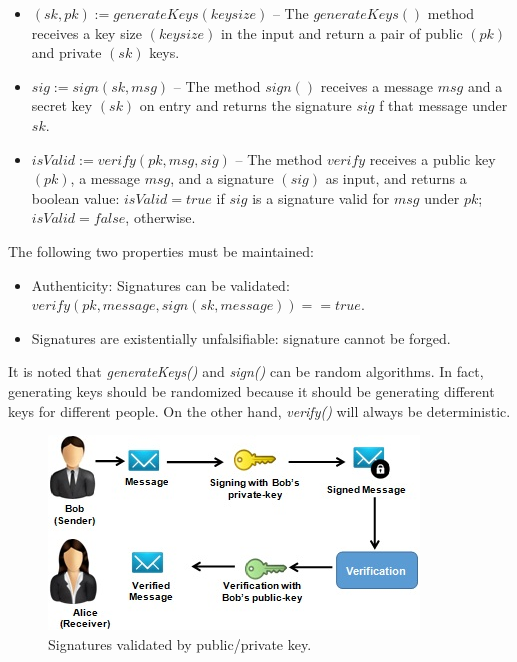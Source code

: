 \begin{itemize}
\item $(sk , pk) := generateKeys(keysize)$ – The $generateKeys()$ method receives a key size $(keysize)$ in the input and return a pair of public $(pk)$ and private $(sk)$ keys.
\item $sig := sign(sk , msg)$ – The method $sign()$ receives a message $msg$ and a secret key $(sk)$ on entry and returns the signature $sig$ f that message under $sk$.
\item $isValid := verify(pk , msg , sig)$ – The method $verify$ receives a public key $(pk)$, a message $msg$, and a signature $(sig)$ as input, and returns a boolean value: $isValid = true$ if $sig$ is a signature valid for $msg$ under $pk$; $isValid = false$, otherwise.
\end{itemize}

The following two properties must be maintained:

\begin{itemize}
\item Authenticity: Signatures can be validated: \\ $verify(pk, message, sign(sk, message)) = = true$.
\item Signatures are existentially unfalsifiable: signature cannot be forged.
\end{itemize}

It is noted that \textit{generateKeys()} and \textit{sign()} can be random algorithms. In fact, generating keys should be randomized because it should be generating different keys for different people. On the other hand, \textit{verify()} will always be deterministic.

\begin{figure}[htbp]
\begin{center}
  \includegraphics[scale=1.0]{images/AliceBob.jpg}
\caption{Signatures validated by public/private key.}
\label{fig:authenticationExample}
\end{center}
\end{figure}

